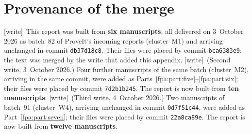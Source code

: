 \documentclass[11pt,a4paper]{article}
\newcommand{\fpaheadL}{Five-particle binary automata}
\newcommand{\fpaheadR}{Front matter}
\numberwithin{equation}{section}
\newcommand{\wtag}{\textup{[write]}}
\begin{document}
\appendix
\renewcommand{\fpaheadL}{Five-particle binary automata}\renewcommand{\fpaheadR}{Appendix}

\section{Provenance of the merge}\label{fpa:app:provenance}
\wtag\ This report was built from \textbf{six manuscripts}, all delivered on 3~October 2026 as batch~82 of ProveIt's incoming reports (cluster~M1) and arriving unchanged in commit \texttt{db37d18c8}. Their files were placed by commit \texttt{bca6383e9}; the text was merged by the write that added this appendix. \wtag\ (Second write, 3~October 2026.) Four further manuscripts of the same batch (cluster~M2), arriving in the same commit, were added as Parts~\ref{fpa:part:five}--\ref{fpa:part:six}; their files were placed by commit \texttt{7d2b1b245}. The report is now built from \textbf{ten manuscripts}. \wtag\ (Third write, 4~October 2026.) Two manuscripts of batch~91 (cluster~W4), arriving unchanged in commit \texttt{0d7f51c44}, were added as Part~\ref{fpa:part:seven}; their files were placed by commit \texttt{22a8ca89e}. The report is now built from \textbf{twelve manuscripts}.
\end{document}
